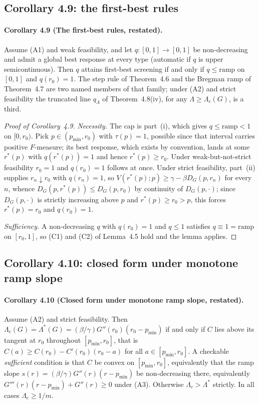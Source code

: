\documentclass[acmsmall,nonacm,screen]{acmart}
\theoremstyle{acmplain}%
\theoremstyle{acmdefinition}%
\numberwithin{equation}{section}
\begin{document}
\begin{appendix}
\subsection{Corollary 4.9: the first-best rules}

\paragraph*{Corollary 4.9 (The first-best rules, restated).}
Assume (A1) and weak feasibility, and let $q : [0,1] \to [0,1]$ be non-decreasing and admit a global best response at every type (automatic if $q$ is upper semicontinuous). Then $q$ attains first-best screening if and only if $q \le \mathrm{ramp}$ on $[0,1]$ and $q(r_0) = 1$. The step rule of Theorem~4.6 and the Bregman ramp of Theorem~4.7 are two named members of that family; under (A2) and strict feasibility the truncated line $q_\Lambda$ of Theorem~4.8(iv), for any $\Lambda \ge \Lambda_c(G)$, is a third.

\begin{proof}[Proof of Corollary~4.9]
\emph{Necessity.} The cap is part~(i), which gives $q\leq\mathrm{ramp}<1$ on $[0,r_0)$. Pick $p\in(p_{\min},r_0)$ with $\tau(p)=1$, possible since that interval carries positive $F$-measure; its best response, which exists by convention, lands at some $r^*(p)$ with $q(r^*(p))=1$ and hence $r^*(p)\geq r_0$. Under weak-but-not-strict feasibility $r_0=1$ and $q(r_0)=1$ follows at once. Under strict feasibility, part~(ii) supplies $r_n\downarrow r_0$ with $q(r_n)=1$, so $V(r^*(p);p)\geq\gamma-\beta D_G(p,r_n)$ for every $n$, whence $D_G(p,r^*(p))\leq D_G(p,r_0)$ by continuity of $D_G(p,\cdot)$; since $D_G(p,\cdot)$ is strictly increasing above $p$ and $r^*(p)\geq r_0>p$, this forces $r^*(p)=r_0$ and $q(r_0)=1$.

\emph{Sufficiency.} A non-decreasing $q$ with $q(r_0)=1$ and $q\leq1$ satisfies $q\equiv1=\mathrm{ramp}$ on $[r_0,1]$, so (C1) and (C2) of Lemma~4.5 hold and the lemma applies.
\end{proof}


\subsection{Corollary 4.10: closed form under monotone ramp slope}

\paragraph*{Corollary 4.10 (Closed form under monotone ramp slope, restated).}
Assume (A2) and strict feasibility. Then $\Lambda_c(G) = \Lambda^*(G) = (\beta/\gamma) G''(r_0)(r_0 - p_{\min})$ if and only if $C$ lies above its tangent at $r_0$ throughout $[p_{\min},r_0]$, that is $C(a) \ge C(r_0) - C'(r_0)(r_0-a)$ for all $a \in [p_{\min},r_0]$. A checkable \emph{sufficient} condition is that $C$ be convex on $[p_{\min},r_0]$, equivalently that the ramp slope $s(r) = (\beta/\gamma)G''(r)(r-p_{\min})$ be non-decreasing there, equivalently $G'''(r)(r-p_{\min}) + G''(r) \ge 0$ under (A3). Otherwise $\Lambda_c > \Lambda^*$ strictly. In all cases $\Lambda_c \ge 1/m$.


\end{appendix}
\end{document}
